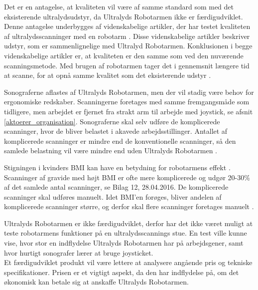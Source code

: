 Det er en antagelse, at kvaliteten vil være af samme standard som med det eksisterende ultralydsudstyr, da Ultralyds Robotarmen ikke er færdigudviklet. Denne antagelse underbygges af videnskabelige artikler, der har testet kvaliteten af ultralydsscanninger med en robotarm \cite{8}\cite{18}\cite{Hjerterobot}. Disse videnskabelige artikler beskriver udstyr, som er sammenlignelige med Ultralyd Robotarmen. Konklusionen i begge videnskabelige artikler er, at kvaliteten er den samme som ved den nuværende scanningsmetode. Med brugen af robotarmen tager det i gennemsnit længere tid at scanne, for at opnå samme kvalitet som det eksisterende udstyr \cite{18}. 

Sonograferne aflastes af Ultralyds Robotarmen, men der vil stadig være behov for ergonomiske redskaber. Scanningerne foretages med samme fremgangsmåde som tidligere, men arbejdet er fjernet fra strakt arm til arbejde med joystick, se afsnit \ref{aktoerer_organisation}. Sonograferne skal selv udføre de komplicerede scanninger, hvor de bliver belastet i akavede arbejdsstillinger. Antallet af komplicerede scanninger er mindre end de konventionelle scanninger, så den samlede belastning vil være mindre end uden Ultralyds Robotarmen \cite{24}. 

Stigningen i kvinders BMI kan have en betydning for robotarmens effekt \cite{kvinderovervaegt}. Scanninger af gravide med højt BMI er ofte mere komplicerede og udgør 20-30\% af det samlede antal scanninger, se Bilag 12, 28.04.2016. De komplicerede scanninger skal udføres manuelt. Idet BMI’en forøges, bliver andelen af komplicerede scanninger større, og derfor skal flere scanninger foretages manuelt \cite{24}\cite{31}\cite{8}. 

Ultralyds Robotarmen er ikke færdigudviklet, derfor har det ikke været muligt at teste robotarmens funktioner på en ultralydsscannings stue. En test ville kunne vise, hvor stor en indflydelse Ultralyds Robotarmen har på arbejdsgener, samt hvor hurtigt sonografer lærer at bruge joysticket. \\ 
Et færdigudviklet produkt vil være lettere at analysere angående pris og tekniske specifikationer. Prisen er et vigtigt aspekt, da den har indflydelse på, om det økonomisk kan betale sig at anskaffe Ultralyds Robotarmen. 